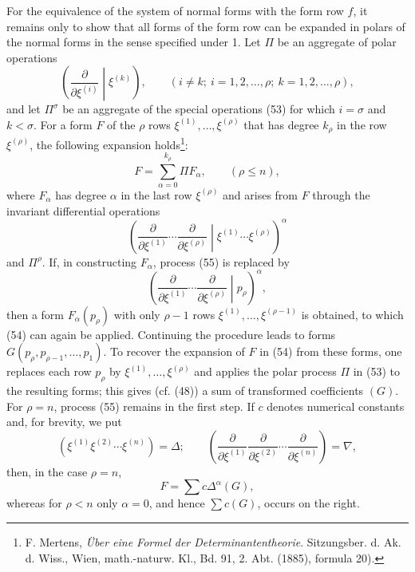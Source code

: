 \documentclass[10pt]{article}
\begin{document}
For the equivalence of the system of normal forms with the form row $f$, it
remains only to show that all forms of the form row can be expanded in polars
of the normal forms in the sense specified under 1. Let $\Pi$ be an aggregate
of polar operations
\begin{equation}
 \left(\frac{\partial}{\partial\xi^{(i)}}\middle|\xi^{(k)}\right),
 \qquad(i\ne k;\ i=1,2,\ldots,\rho;\ k=1,2,\ldots,\rho),
\tag{53}
\end{equation}
and let $\Pi^\sigma$ be an aggregate of the special operations (53) for
which $i=\sigma$ and $k<\sigma$. For a form $F$ of the $\rho$ rows
$\xi^{(1)},\ldots,\xi^{(\rho)}$ that has degree $k_\rho$ in the row
$\xi^{(\rho)}$, the following expansion holds\footnote{F. Mertens,
\emph{\"Uber eine Formel der Determinantentheorie}. Sitzungsber. d. Ak. d.
Wiss., Wien, math.-naturw. Kl., Bd. 91, 2. Abt. (1885), formula 20).}:
\begin{equation}
 F=\sum_{\alpha=0}^{k_\rho}\Pi F_\alpha,
 \qquad(\rho\leq n),
\tag{54}
\end{equation}
where $F_\alpha$ has degree $\alpha$ in the last row $\xi^{(\rho)}$ and
arises from $F$ through the invariant differential operations
\begin{equation}
 \left(\frac{\partial}{\partial\xi^{(1)}}\cdots
 \frac{\partial}{\partial\xi^{(\rho)}}\middle|
 \xi^{(1)}\cdots\xi^{(\rho)}\right)^\alpha
\tag{55}
\end{equation}
and $\Pi^\rho$. If, in constructing $F_\alpha$, process (55) is replaced by
\begin{equation}
 \left(\frac{\partial}{\partial\xi^{(1)}}\cdots
 \frac{\partial}{\partial\xi^{(\rho)}}\middle|p_\rho\right)^\alpha,
\tag{56}
\end{equation}
then a form $F_\alpha(p_\rho)$ with only $\rho-1$ rows
$\xi^{(1)},\ldots,\xi^{(\rho-1)}$ is obtained, to which (54) can again be
applied. Continuing the procedure leads to forms
$G(p_\rho,p_{\rho-1},\ldots,p_1)$. To recover the expansion of $F$ in (54)
from these forms, one replaces each row $p_\rho$ by
$\xi^{(1)},\ldots,\xi^{(\rho)}$ and applies the polar process $\Pi$ in (53)
to the resulting forms; this gives (cf. (48)) a sum of transformed
coefficients $(G)$. For $\rho=n$, process (55) remains in the first step. If
$c$ denotes numerical constants and, for brevity, we put
\begin{equation}
 (\xi^{(1)}\xi^{(2)}\cdots\xi^{(n)})=\Delta;
 \qquad
 \left(\frac{\partial}{\partial\xi^{(1)}}
 \frac{\partial}{\partial\xi^{(2)}}\cdots
 \frac{\partial}{\partial\xi^{(n)}}\right)=\nabla,
\tag{57}
\end{equation}
then, in the case $\rho=n$,
\begin{equation}
 F=\sum c\Delta^\alpha(G),
\tag{58}
\end{equation}
whereas for $\rho<n$ only $\alpha=0$, and hence $\sum c(G)$, occurs on the
right.
\end{document}
